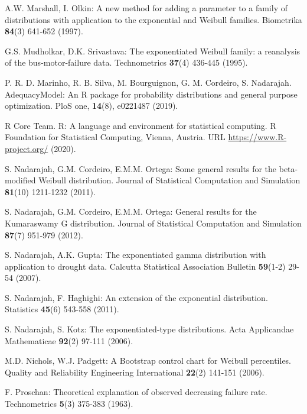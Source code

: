 \documentclass[twoside,leqno,11pt]{article}
\begin{document}
\begin{thebibliography}{8}
\item
A.W. Marshall, I. Olkin:
A new method for adding a parameter to a family of distributions with
application to the exponential and Weibull families.
Biometrika {\bf 84}(3) 641-652 (1997).

\item
G.S. Mudholkar, D.K. Srivastava:
The exponentiated Weibull family: a reanalysis of the bus-motor-failure data.
Technometrics {\bf 37}(4) 436-445 (1995).

\item 
P. R. D. Marinho,  R. B. Silva,  M. Bourguignon, G. M. Cordeiro,  S. Nadarajah. AdequacyModel: An R package for probability distributions and general purpose optimization. PloS one, {\bf 14}(8), e0221487 (2019).

\item
R Core Team. R: A language and environment for statistical computing. R Foundation for Statistical Computing, Vienna, Austria. URL
\url{https://www.R-project.org/} (2020).

\item
S. Nadarajah, G.M. Cordeiro, E.M.M. Ortega:
Some general results for the beta-modified Weibull distribution.
Journal of Statistical Computation and Simulation {\bf 81}(10) 1211-1232 (2011).

\item
S. Nadarajah, G.M. Cordeiro, E.M.M. Ortega:
General results for the Kumaraswamy G distribution.
Journal of Statistical Computation and Simulation {\bf 87}(7) 951-979 (2012).

\item
S. Nadarajah, A.K. Gupta:
The exponentiated gamma distribution with application to drought data.
Calcutta Statistical Association Bulletin {\bf 59}(1-2) 29-54 (2007).

\item
S. Nadarajah, F. Haghighi:
An extension of the exponential distribution.
Statistics {\bf 45}(6) 543-558 (2011).

\item
S. Nadarajah, S. Kotz:
The exponentiated-type distributions.
Acta Applicandae Mathematicae {\bf 92}(2) 97-111 (2006).

\item
M.D. Nichols, W.J. Padgett:
A Bootstrap control chart for Weibull percentiles.
Quality and Reliability Engineering International {\bf 22}(2) 141-151 (2006).

\item
F. Proschan:
Theoretical explanation of observed decreasing failure rate.
Technometrics {\bf 5}(3) 375-383 (1963).


\end{thebibliography}
\end{document}
